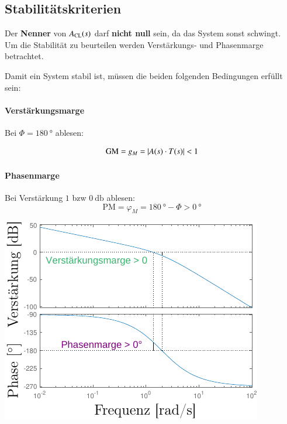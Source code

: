 


\subsection{Stabilitätskriterien}
Der \textbf{Nenner} von $A_{\rm CL}(s)$ darf \textbf{nicht null} sein, da das System sonst schwingt. \\
Um die Stabilität zu beurteilen werden Verstärkungs- und Phasenmarge betrachtet.

\medskip

Damit ein System stabil ist, müssen die beiden folgenden Bedingungen erfüllt sein:

\smallskip

\begin{minipage}[t]{0.48\columnwidth}
    \paragraph{Verstärkungsmarge}

    Bei $\Phi = \qty{180}{\degree}$ ablesen:

    \[
        \text{GM} = g_M = \left|A(s) \cdot T(s)\right| < 1
    \]

    \smallskip

    \paragraph{Phasenmarge}

    Bei Verstärkung $1$ bzw  $\qty{0}{\decibel}$ ablesen:
    \[
        \text{PM} = \varphi_M = \qty{180}{\degree} - \Phi > \qty{0}{\degree}
    \]
\end{minipage}
\hfill
\begin{minipage}[t]{0.48\columnwidth}
    \includegraphics[width=\columnwidth, align=t]{images/10_bode_plot_V2.pdf}
\end{minipage}

